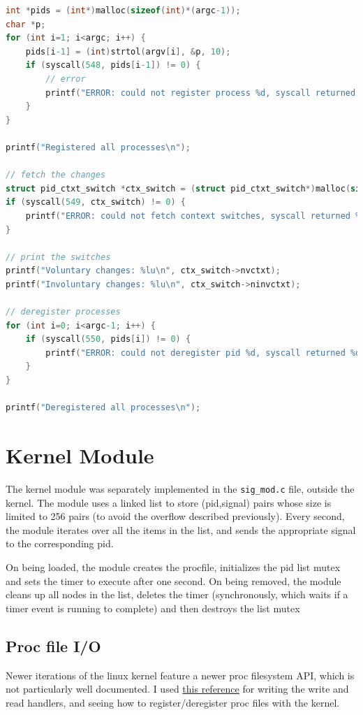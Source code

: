\documentclass[12pt]{article}
\begin{document}
\begin{lstlisting}[language=C]
int *pids = (int*)malloc(sizeof(int)*(argc-1));
char *p;
for (int i=1; i<argc; i++) {
    pids[i-1] = (int)strtol(argv[i], &p, 10);
    if (syscall(548, pids[i-1]) != 0) {
        // error
        printf("ERROR: could not register process %d, syscall returned %d\n", pids[i-1], errno);
    }
}

printf("Registered all processes\n");

// fetch the changes
struct pid_ctxt_switch *ctx_switch = (struct pid_ctxt_switch*)malloc(sizeof(struct pid_ctxt_switch));
if (syscall(549, ctx_switch) != 0) {
    printf("ERROR: could not fetch context switches, syscall returned %d\n", errno);
}

// print the switches
printf("Voluntary changes: %lu\n", ctx_switch->nvctxt);
printf("Involuntary changes: %lu\n", ctx_switch->ninvctxt);

// deregister processes
for (int i=0; i<argc-1; i++) {
    if (syscall(550, pids[i]) != 0) {
        printf("ERROR: could not deregister pid %d, syscall returned %d\n", pids[i], errno);
    }
}

printf("Deregistered all processes\n");
\end{lstlisting}

\pagebreak

\section{Kernel Module}

The kernel module was separately implemented in the \texttt{sig\_mod.c} file,
outside the kernel. The module uses a linked list to store (pid,signal) pairs
whose size is limited to 256 pairs (to avoid the overflow described previously).
Every second, the module iterates over all the items in the list, and sends the
appropriate signal to the corresponding pid. 

On being loaded, the module creates the procfile, initializes the pid list 
mutex and sets the timer to execute after one second. On being removed, the 
module cleans up all nodes in the list, deletes the timer (synchronously, which
waits if a timer event is running to complete) and then destroys the list mutex

\subsection{Proc file I/O}
Newer iterations of the linux kernel feature a newer proc filesystem API, which
is not particularly well documented. I used 
\href{https://devarea.com/linux-kernel-development-creating-a-proc-file-and-interfacing-with-user-space/}
{this reference} for writing the write and read handlers, and seeing how to 
register/deregister proc files with the kernel.
\end{document}

